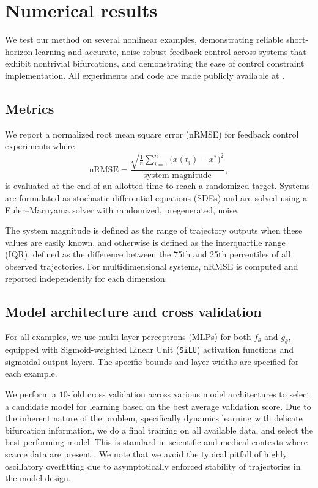 \documentclass[11pt,twoside]{article}
\theoremstyle{plain}
\theoremstyle{definition}
\theoremstyle{remark}
\begin{document}
\section{Numerical results}
\label{sec:numerical-results}
We test our method on several nonlinear examples, demonstrating reliable short-horizon learning and accurate, noise-robust feedback control across systems that exhibit nontrivial bifurcations, and demonstrating the ease of control constraint implementation. All experiments and code are made publicly available at \cite{pnnl_ftnode}.


\subsection*{Metrics}
We report a normalized root mean square error (nRMSE) for feedback control experiments where
\begin{equation}
    \text{nRMSE} = \frac{\sqrt{\frac{1}{n}\sum_{i=1}^n \big(x(t_i) - x^*\big)^2}}{\text{system magnitude}},
\end{equation}
is evaluated at the end of an allotted time to reach a randomized target. Systems are formulated as stochastic differential equations (SDEs) and are solved using a Euler--Maruyama solver with randomized, pregenerated, noise. 

The system magnitude is defined as the range of trajectory outputs when these values are easily known, and otherwise is defined as the interquartile range (IQR), defined as the difference between the 75th and 25th percentiles of all observed trajectories. For multidimensional systems, nRMSE is computed and reported independently for each dimension.


\subsection*{Model architecture and cross validation}
For all examples, we use multi-layer perceptrons (MLPs) for both \(f_\theta\) and \(g_\theta\), equipped with Sigmoid-weighted Linear Unit (\texttt{SiLU}) activation functions and sigmoidal output layers. The specific bounds and layer widths are specified for each example.

We perform a \(10\)-fold cross validation across various model architectures to select a candidate model for learning based on the best average validation score. Due to the inherent nature of the problem, specifically dynamics learning with delicate bifurcation information, we do a final training on all available data, and select the best performing model. This is standard in scientific and medical contexts where scarce data are present \cite{Tsamardinos2022, Bradshaw2023}.  We note that we avoid the typical pitfall of highly oscillatory overfitting due to asymptotically enforced stability of trajectories in the model design.
\end{document}
